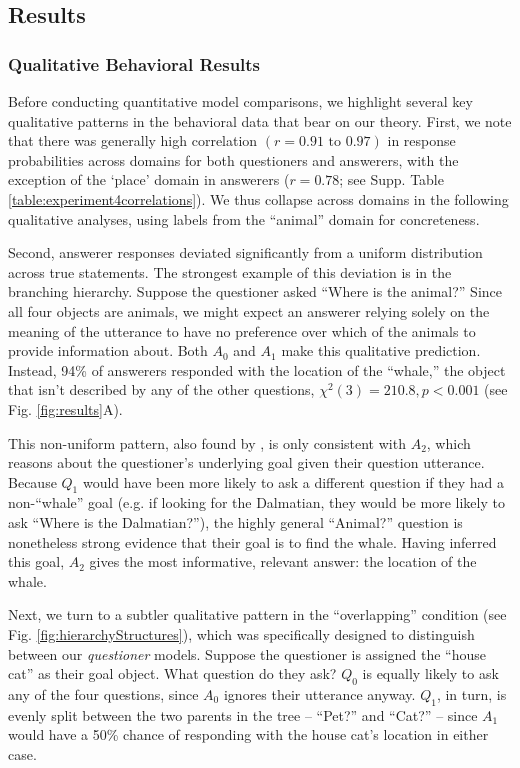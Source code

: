 \documentclass[12pt, floatsintext, jou]{apa6}
\begin{document}
\subsection{Results}
\subsubsection{Qualitative Behavioral Results}

Before conducting quantitative model comparisons, we highlight several key qualitative patterns in the behavioral data that bear on our theory. First, we note that there was generally high correlation $(r = 0.91 \textrm{ to } 0.97)$ in response probabilities across domains for both questioners and answerers, with the exception of the `place' domain in answerers ($r = 0.78$; see Supp. Table \ref{table:experiment4correlations}). We thus collapse across domains in the following qualitative analyses, using labels from the ``animal'' domain for concreteness.

Second, answerer responses deviated significantly from a uniform distribution across true statements. The strongest example of this deviation is in the branching hierarchy. Suppose the questioner asked ``Where is the animal?'' Since all four objects are animals, we might expect an answerer relying solely on the meaning of the utterance to have no preference over which of the animals to provide information about. Both $A_0$ and $A_1$ make this qualitative prediction. Instead, 94\% of answerers responded with the location of the ``whale,'' the object that isn't described by any of the other questions, $\chi^2(3) = 210.8, p < 0.001$ (see Fig. \ref{fig:results}A).

This non-uniform pattern, also found by , is only consistent with $A_2$, which reasons about the questioner's underlying goal given their question utterance. Because $Q_1$ would have been more likely to ask a different question if they had a non-``whale'' goal (e.g. if looking for the Dalmatian, they would be more likely to ask ``Where is the Dalmatian?''), the highly general ``Animal?'' question is nonetheless strong evidence that their goal is to find the whale. Having inferred this goal, $A_2$ gives the most informative, relevant answer: the location of the whale.

Next, we turn to a subtler qualitative pattern in the ``overlapping'' condition (see Fig. \ref{fig:hierarchyStructures}), which was specifically designed to distinguish between our \emph{questioner} models. Suppose the questioner is assigned the ``house cat'' as their goal object. What question do they ask? $Q_0$ is equally likely to ask any of the four questions, since $A_0$ ignores their utterance anyway. $Q_1$, in turn, is evenly split between the two parents in the tree -- ``Pet?'' and ``Cat?'' -- since $A_1$ would have a 50\% chance of responding with the house cat's location in either case. 
\end{document}
